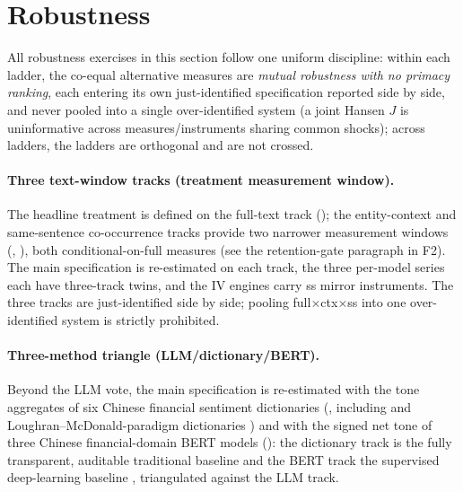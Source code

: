 \section{Robustness}\label{sec:robust}

All robustness exercises in this section follow one uniform
discipline: within each ladder, the co-equal alternative measures are
\emph{mutual robustness with no primacy ranking}, each entering its
own just-identified specification reported side by side, and never
pooled into a single over-identified system (a joint Hansen $J$ is
uninformative across measures/instruments sharing common shocks);
across ladders, the ladders are orthogonal and are not crossed.

\paragraph{Three text-window tracks (treatment measurement window).}
The headline treatment is defined on the full-text track
(); the entity-context and same-sentence
co-occurrence tracks provide two narrower measurement windows
(, ), both
conditional-on-full measures (see the retention-gate paragraph in F2).
The main specification is re-estimated on each track, the three
per-model series each have three-track twins, and the IV engines carry
ss mirror instruments. The three tracks are just-identified side by
side; pooling full$\times$ctx$\times$ss into one over-identified
system is strictly prohibited.

\paragraph{Three-method triangle (LLM/dictionary/BERT).}
Beyond the LLM vote, the main specification is re-estimated with the
tone aggregates of six Chinese financial sentiment dictionaries
(, including \textcite{du2022dictionary} and
Loughran--McDonald-paradigm dictionaries
\parencite{loughran2011liability}) and with the signed net tone of
three Chinese financial-domain BERT models
(): the
dictionary track is the fully transparent, auditable traditional
baseline and the BERT track the supervised deep-learning baseline
\parencite{huang2023finbert, frankel2022disclosure}, triangulated
against the LLM track.

